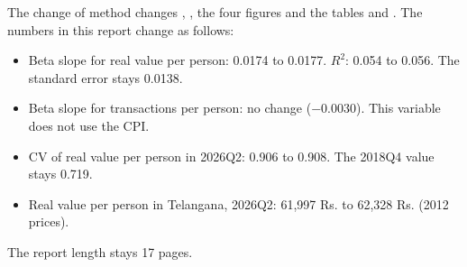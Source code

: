 \documentclass[11pt,a4paper]{article}
\begin{document}
The change of method changes , , the four figures and the tables  and .
The numbers in this report change as follows:
\begin{itemize}
\item Beta slope for real value per person: 0.0174 to 0.0177. $R^2$: 0.054 to 0.056. The standard error stays 0.0138.
\item Beta slope for transactions per person: no change ($-0.0030$). This variable does not use the CPI.
\item CV of real value per person in 2026Q2: 0.906 to 0.908. The 2018Q4 value stays 0.719.
\item Real value per person in Telangana, 2026Q2: 61,997 Rs. to 62,328 Rs. (2012 prices).
\end{itemize}
The report length stays 17 pages.
\end{document}

